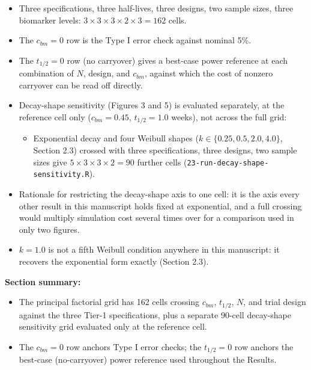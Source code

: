 \documentclass[
  11pt,
]{article}
\providecommand{\tightlist}{%
  \setlength{\itemsep}{0pt}\setlength{\parskip}{0pt}}
\begin{document}
\begin{itemize}
\tightlist
\item
  Three specifications, three half-lives, three designs, two sample
  sizes, three biomarker levels: \(3 \times 3 \times 3 \times 2 \times
  3 = 162\) cells.
\item
  The \(c_{bm} = 0\) row is the Type I error check against nominal 5\%.
\item
  The \(t_{1/2} = 0\) row (no carryover) gives a best-case power
  reference at each combination of \(N\), design, and \(c_{bm}\), against
  which the cost of nonzero carryover can be read off directly.
\item
  Decay-shape sensitivity (Figures 3 and 5) is evaluated separately,
  at the reference cell only (\(c_{bm} = 0.45\), \(t_{1/2} = 1.0\)
  weeks), not across the full grid:

  \begin{itemize}
  \tightlist
  \item
    Exponential decay and four Weibull shapes (\(k \in \{0.25, 0.5,
    2.0, 4.0\}\), Section 2.3) crossed with three specifications,
    three designs, two sample sizes give \(5 \times 3 \times 3 \times
    2 = 90\) further cells (\texttt{23-run-decay-shape-sensitivity.R}).
  \end{itemize}
\item
  Rationale for restricting the decay-shape axis to one cell: it is
  the axis every other result in this manuscript holds fixed at
  exponential, and a full crossing would multiply simulation cost
  several times over for a comparison used in only two figures.
\item
  \(k = 1.0\) is not a fifth Weibull condition anywhere in this
  manuscript: it recovers the exponential form exactly (Section 2.3).
\end{itemize}

\textbf{Section summary:}

\begin{itemize}
\tightlist
\item
  The principal factorial grid has 162 cells crossing \(c_{bm}\),
  \(t_{1/2}\), \(N\), and trial design against the three Tier-1
  specifications, plus a separate 90-cell decay-shape sensitivity
  grid evaluated only at the reference cell.
\item
  The \(c_{bm}=0\) row anchors Type I error checks; the \(t_{1/2}=0\) row
  anchors the best-case (no-carryover) power reference used
  throughout the Results.
\end{itemize}
\end{document}
